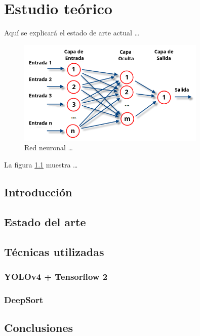 
\chapter{Estudio teórico}
\label{cha:estudio-teorico}

Aquí se explicará el estado de arte actual \ldots

\begin{figure}[!h]
\centering
\includegraphics[width=0.8\textwidth]{img/rnn.png}
\caption{\label{fig:rnn}Red neuronal \ldots}
\end{figure}
La figura \ref{fig:rnn} muestra \ldots

\section{Introducción}
\label{sec:intro-sota}

\section{Estado del arte}
\label{sec:sota}

\section{Técnicas utilizadas}
\label{sec:tecnicas-utilizadas}

\subsection{YOLOv4 + Tensorflow 2}
\label{sec:tecnicas-utilizadas1}

\subsection{DeepSort}
\label{sec:tecnicas-utilizadas2}

\section{Conclusiones}
\label{sec:conclu-sota}
